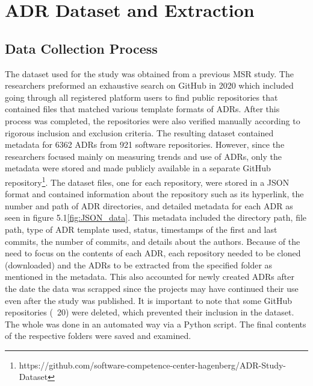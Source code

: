 \chapter{ADR Dataset and Extraction}

    \section{Data Collection Process}
        The dataset used for the study was obtained from a previous MSR study\cite{Github_study_ADRs}. The researchers preformed an exhaustive search on GitHub in 2020 which included going through all registered platform users to find public repositories that contained files that matched various template formats of ADRs. After this process was completed, the repositories were also verified manually according to rigorous inclusion and exclusion criteria. The resulting dataset contained metadata for 6362 ADRs from 921 software repositories. However, since the researchers focused mainly on measuring trends and use of ADRs, only the metadata were stored and made publicly available in a separate GitHub repository\footnote{https://github.com/software-competence-center-hagenberg/ADR-Study-Dataset}. The dataset files, one for each repository, were stored in a JSON format and contained information about the repository such as its hyperlink, the number and path of ADR directories, and detailed metadata for each ADR as seen in figure 5.1\ref{fig:JSON_data}. This metadata included the directory path, file path, type of ADR template used, status, timestamps of the first and last commits, the number of commits, and details about the authors. Because of the need to focus on the contents of each ADR, each repository needed to be cloned (downloaded) and the ADRs to be extracted from the specified folder as mentioned in the metadata. This also accounted for newly created ADRs after the date the data was scrapped since the projects may have continued their use even after the study was published. It is important to note that some GitHub repositories (~20) were deleted, which prevented their inclusion in the dataset. The whole was done in an automated way via a Python script. The final contents of the respective folders were saved and examined.

